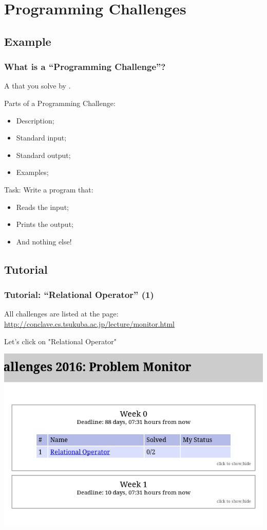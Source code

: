 \documentclass{beamer}
\begin{document}
\section{Programming Challenges}
\subsection{Example}

\begin{frame}
  \frametitle{What is a ``Programming Challenge''?}

  A  that you solve by .

  \bigskip

  Parts of a Programming Challenge:
  \begin{itemize}
  \item Description;
  \item Standard input;
  \item Standard output;
  \item Examples;
  \end{itemize}

  \bigskip

  Task: Write a program that:
  \begin{itemize}
    \item Reads the input;
    \item Prints the  output;
    \item And nothing else!
  \end{itemize}
\end{frame}

\subsection{Tutorial}
\begin{frame}
  \frametitle{Tutorial: ``Relational Operator'' (1)}

  All challenges are listed at the page:\\
  {\smaller \url{http://conclave.cs.tsukuba.ac.jp/lecture/monitor.html}}

  \bigskip

  Let's click on "Relational Operator"

  \begin{center}
    \includegraphics[width=.7\textwidth]{../img/monitorpage}
  \end{center}

\end{frame}
\end{document}
